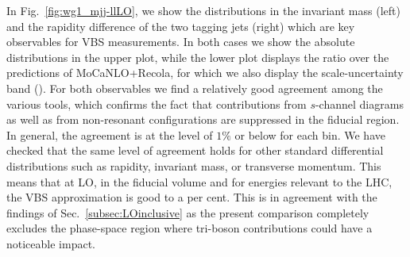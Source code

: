 In Fig.~\ref{fig:wg1_mjj-llLO}, we show the distributions in the invariant mass (left) and the rapidity difference of the two tagging jets (right) which are key observables for VBS measurements.
In both cases we show the absolute distributions in the upper plot, while the lower plot displays the ratio over the predictions of {\sc MoCaNLO+Recola}, 
for which we also display the scale-uncertainty band ().
For both observables we find a relatively good agreement among the various tools, which confirms the fact that contributions from $s$-channel diagrams as well as from non-resonant configurations are suppressed in the fiducial region.
In general, the agreement is at the level of $1\%$ or below for each bin.
We have checked that the same level of agreement holds for other standard differential distributions such as rapidity, invariant mass, or transverse momentum.
This means that at LO, in the fiducial volume and for energies relevant to the LHC, the VBS approximation is good to a per cent.
This is in agreement with the findings of Sec.~\ref{subsec:LOinclusive} as the present comparison completely excludes the phase-space region where tri-boson contributions could have a noticeable impact.

